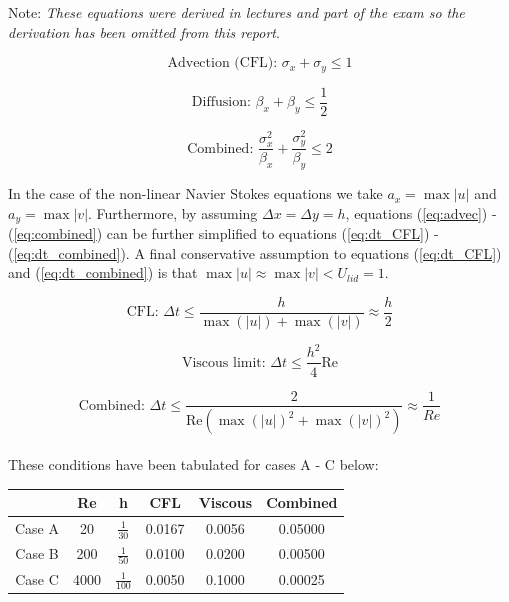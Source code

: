\documentclass[10pt,a4paper]{article}
\begin{document}
\noindent Note: \textit{These equations were derived in lectures and part of the exam so the derivation has been omitted from this report}.

\begin{equation}
\label{eq:advec}
\text{Advection (CFL):  } \sigma_x + \sigma_y \leq 1 
\end{equation}

\begin{equation}
\label{eq:dif}
\text{Diffusion: } \beta_x + \beta_y \leq \frac{1}{2}
\end{equation}

\begin{equation}
\label{eq:combined}
\text{Combined: } \frac{\sigma_x^2}{\beta_x} + \frac{\sigma_y^2}{\beta_y} \leq 2
\end{equation} 

In the case of the non-linear Navier Stokes equations we take $a_x = \max{|u|}$ and $a_y = \max{|v|}$. Furthermore, by assuming $\Delta x = \Delta y = h$, equations (\ref{eq:advec}) - (\ref{eq:combined}) can be further simplified to equations (\ref{eq:dt_CFL}) - (\ref{eq:dt_combined}). A final conservative assumption to equations  (\ref{eq:dt_CFL}) and (\ref{eq:dt_combined}) is that $ \max{|u|} \approx\max{|v|} < U_{lid} = 1$.

\begin{equation}
\label{eq:dt_CFL}
\text{CFL: } \Delta t \leq \frac{h}{\max(|u|) + \max(|v|)}  \approx \frac{h}{2}
\end{equation}

\begin{equation}
\label{eq:dt_diffusion}
\text{Viscous limit: } \Delta t \leq \frac{h^2}{4} \text{Re}
\end{equation}

\begin{equation}
\label{eq:dt_combined}
\text{Combined: } \Delta t \leq \frac{2}{\text{Re} \left(\max(|u|)^2 + \max(|v|)^2\right)}  \approx \frac{1}{Re}
\end{equation}\\




These conditions have been tabulated for cases A - C below:

\begin{center}


\begin{tabular}{c|cc|ccc}

 & Re & h & CFL & Viscous & Combined \\ 
\hline 
Case A  & 20 & $\frac{1}{30}$ & 0.0167 & 0.0056 & 0.05000 \\ 

Case B  & 200  & $\frac{1}{50}$  & 0.0100 & 0.0200& 0.00500  \\ 

Case C & 4000 & $\frac{1}{100}$  & 0.0050 & 0.1000 & 0.00025  \\ 

\end{tabular} 
\end{center}
\end{document}

